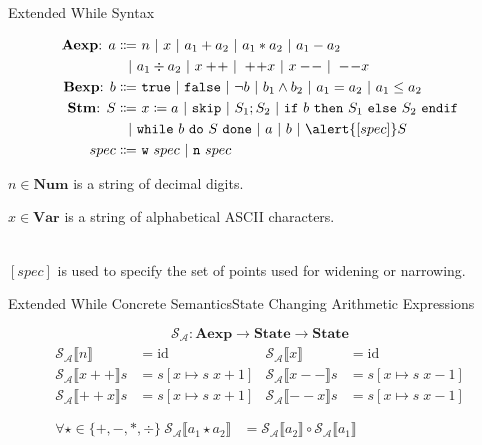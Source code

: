 \documentclass{beamer}
\newcommand{\Aexp}{\textbf{Aexp}}
\newcommand{\Bexp}{\textbf{Bexp}}
\newcommand{\Stm}{\textbf{Stm}}
\newcommand{\State}{\textbf{State}}
\newcommand{\true}{\texttt{true}}
\newcommand{\false}{\texttt{false}}
\newcommand{\sskip}{\texttt{skip}}
\newcommand{\ifelse}[3]{\mathtt{if}\ #1\ \mathtt{then}\ #2\ \mathtt{else}\ #3\ \mathtt{endif}}
\newcommand{\while}[2]{\mathtt{while}\ #1\ \mathtt{do}\ #2\ \mathtt{done}}
\newcommand{\sem}[2]{\mathcal{#1} \llbracket #2 \rrbracket}
\begin{document}
\begin{frame}{Extended While Syntax}

    \begin{align*}
        \mbox{\Aexp: }
        a \Coloneq    & \ n
        \ |\ x
        \ |\ a_1 + a_2
        \ |\ a_1 * a_2
        \ |\ a_1 - a_2                     \\
        \ |\          & a_1 \div a_2
        \ |\ x+\!+
        \ |\ +\!+x
        \ |\ x-\!-
        \ |\ -\!-x
        \\
        \mbox{\Bexp: }
        b \Coloneq    & \ \true
        \ |\ \false
        \ |\ \neg b
        \ |\ b_1 \wedge b_2
        \ |\ a_1 = a_2
        \ |\ a_1 \leq a_2
        \\
        \mbox{\Stm: }
        S \Coloneq    & \ x \coloneq a
        \ |\ \sskip
        \ |\ S_1; S_2
        \ |\ \ifelse{b}{S_1}{S_2}          \\
        \ |\          & \while{b}{S}
        \ |\ a
        \ |\ b
        \ |\ \alert{[spec]} S
        \\
        spec \Coloneq & \ \mathtt{w}\ spec
        \ |\ \mathtt{n}\ spec
    \end{align*}

    $n \in \mathbf{Num}$ is a string of decimal digits.

    $x \in \mathbf{Var}$ is a string of alphabetical ASCII characters.

    ~\\
    $[spec]$ is used to specify the set of points used for widening or narrowing.

\end{frame}

\begin{frame}{Extended While Concrete Semantics}{State Changing Arithmetic Expressions}

    $$\mathcal{S_A} : \Aexp \to \State \to \State$$
    \begin{gather*}
        \begin{aligned}
            \sem{S_A}{n}      & = \mathrm{id}         &
            \sem{S_A}{x}      & = \mathrm{id}           \\
            \sem{S_A}{x+\!+}s & = s[x \mapsto s\;x+1] &
            \sem{S_A}{x-\!-}s & = s[x \mapsto s\;x-1]   \\
            \sem{S_A}{+\!+x}s & = s[x \mapsto s\;x+1] &
            \sem{S_A}{-\!-x}s & = s[x \mapsto s\;x-1]   \\
        \end{aligned} \\
        \begin{aligned}
            \forall \star \in \{+, -, *, \div\}\
            \sem{S_A}{a_1 \star a_2} & = \sem{S_A}{a_2} \circ \sem{S_A}{a_1}
        \end{aligned}
    \end{gather*}

\end{frame}
\end{document}
